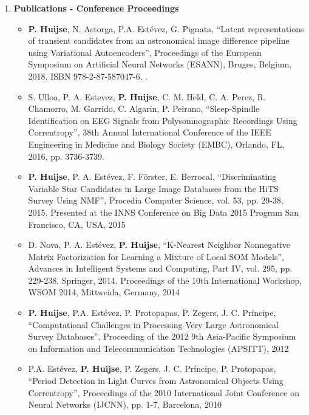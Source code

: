 \documentclass[letterpaper,11pt]{article}
\newcommand{\compactlist}{\setlength{\parskip}{0pt} \setlength{\leftskip}{2em}}
\begin{document}
\begin{enumerate}[I]
    \item \textbf{Publications - Conference Proceedings}

	\begin{itemize}  \compactlist{}
        \item \textbf{P. Huijse}, N. Astorga, P.A. Est\'evez, G. Pignata, ``Latent representations of transient candidates from an astronomical image difference pipeline using Variational Autoencoders'', Proceedings of the European Symposium on Artificial Neural Networks (ESANN), Bruges, Belgium, 2018, ISBN 978-2-87-587047-6, \href{https://www.elen.ucl.ac.be/esann/proceedings/papers.php?ann=2018}{\faExternalLink}.
        \item S. Ulloa, P. A. Estevez, \textbf{P. Huijse}, C. M. Held, C. A. Perez, R. Chamorro, M. Garrido, C. Algarin, P. Peirano, ``Sleep-Spindle Identification on EEG Signals from Polysomnographic Recordings Using Correntropy'', 38th Annual International Conference of the IEEE Engineering in Medicine and Biology Society (EMBC), Orlando, FL, 2016, pp. 3736-3739.
        \item \textbf{P. Huijse}, P. A. Estévez, F. Förster, E. Berrocal, ``Discriminating Variable Star Candidates in Large Image Databases from the HiTS Survey Using NMF'', Procedia Computer Science, vol. 53, pp. 29-38, 2015. Presented at the INNS Conference on Big Data 2015 Program San Francisco, CA, USA, 2015
        \item D. Nova, P. A. Estévez, \textbf{P. Huijse}, ``K-Nearest Neighbor Nonnegative Matrix Factorization for Learning a Mixture of Local SOM Models'', Advances in Intelligent Systems and Computing, Part IV, vol. 295, pp. 229-238, Springer, 2014. Proceedings of the 10th International Workshop, WSOM 2014, Mittweida, Germany,  2014
        \item \textbf{P. Huijse}, P.A. Estévez, P. Protopapas, P. Zegers, J. C. Príncipe,  ``Computational Challenges in Processing Very Large Astronomical Survey Databases'', Proceeding of the 2012 9th Asia-Pacific Symposium on Information and Telecommunication Technologies (APSITT), 2012
        \item P.A. Estévez, \textbf{P. Huijse}, P. Zegers, J. C. Príncipe, P. Protopapas, ``Period Detection in Light Curves from Astronomical Objects Using Correntropy'', Proceedings of the 2010 International Joint Conference on Neural Networks (IJCNN), pp. 1-7, Barcelona,  2010
	\end{itemize}


\end{enumerate}
\end{document}
